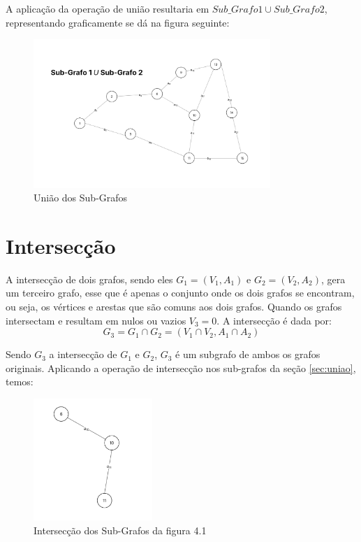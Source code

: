 \documentclass[
12pt,
a4paper,
semrecuonosumario,
sumario = abnt-6027-2012]{report}
\begin{document}
    A aplicação da operação de união resultaria em $Sub\_Grafo1 \cup Sub\_Grafo2$, representando graficamente se dá na figura seguinte:

    \begin{figure}
        \centering
        \includegraphics[width=0.8\textwidth]{figuras/subgrafos/subgrafo1usubgrafo2.png}
        \caption{União dos Sub-Grafos}
        \label{fig:uniaoGrafos}
    \end{figure}

	\section{Intersecção}\label{sec:interseccao}
        A intersecção de dois grafos, sendo eles $G_1 = (V_1, A_1)$ e $G_2 = (V_2, A_2)$, gera um terceiro grafo, esse que é apenas o conjunto onde os dois grafos se encontram, ou seja, os vértices e arestas que são comuns aos dois grafos. Quando os grafos intersectam e resultam em nulos ou vazios $V_3 = 0$. A intersecção é dada por:
        \[
        G_3 = G_1 \cap G_2 = (V_1 \cap V_2, A_1 \cap A_2)
        \]

        Sendo $G_3$ a intersecção de $G_1$ e $G_2$, $G_3$ é um subgrafo de ambos os grafos originais.
        Aplicando a operação de intersecção nos sub-grafos da seção \ref{sec:uniao}, temos:

        \begin{figure}[!h]
            \centering
            \includegraphics[width=0.4\textwidth]{figuras/subgrafos/subgrafo_inter.png}
            \caption{Intersecção dos Sub-Grafos da figura 4.1}
            \label{fig:intersecaoGrafos}
        \end{figure}
\end{document}
